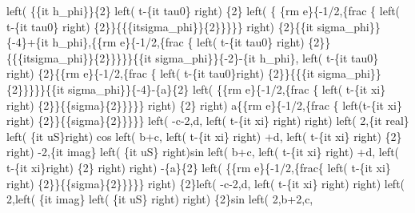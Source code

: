 \begin{maplegroup}
\begin{mapleinput}
\end{mapleinput}
\mapleresult
{}left( \{\{it h\_phi\}\}\{2\} left( t-\{it tau0\} right) \{2\} left( \{
\{rm e\}\{-1/2,\{frac \{ left( t-\{it tau0\} right) \{2\}\}\{\{\{itsigma\_phi\}\}\{2\}\}\}\}\} right) \{2\}\{\{it sigma\_phi\}\}\{-4\}+\{it h\_phi\},\{\{rm e\}\{-1/2,\{frac \{ left( t-\{it tau0\} right) \{2\}\}\{\{\{itsigma\_phi\}\}\{2\}\}\}\}\}\{\{it sigma\_phi\}\}\{-2\}-\{it h\_phi\}, left( t-\{it tau0\} right) \{2\}\{\{rm e\}\{-1/2,\{frac \{ left( t-\{it tau0\}right) \{2\}\}\{\{\{it sigma\_phi\}\}\{2\}\}\}\}\}\{\{it sigma\_phi\}\}\{-4\}-\{a\}\{2\} left( \{\{rm e\}\{-1/2,\{frac \{ left( t-\{it xi\} right) \{2\}\}\{\{sigma\}\{2\}\}\}\}\} right) \{2\} right) a\{\{rm e\}\{-1/2,\{frac \{ left(t-\{it xi\} right) \{2\}\}\{\{sigma\}\{2\}\}\}\}\} left( -c-2,d, left( t-\{it xi\} right)  right)  left( 2,\{it real\} left( \{it uS\}right) cos left( b+c, left( t-\{it xi\} right) +d, left( t-\{it xi\} right) \{2\} right) -2,\{it imag\} left( \{it uS\} right)sin left( b+c, left( t-\{it xi\} right) +d, left( t-\{it xi\}right) \{2\} right)  right) -\{a\}\{2\} left( \{\{rm e\}\{-1/2,\{frac\{ left( t-\{it xi\} right) \{2\}\}\{\{sigma\}\{2\}\}\}\}\} right) \{2\}left( -c-2,d, left( t-\{it xi\} right)  right)  left( 2,left( \{it imag\} left( \{it uS\} right)  right) \{2\}sin left( 2,b+2,c, 
\end{maplegroup}
